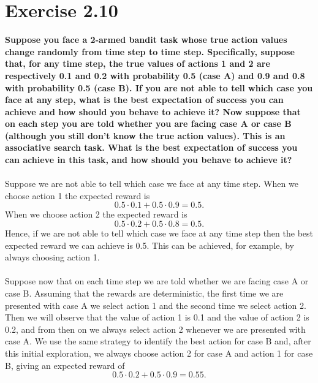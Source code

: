 \documentclass[a4paper,11pt]{article}
\numberwithin{equation}{section}
\theoremstyle{remark}
\begin{document}
\section{Exercise 2.10}

\textbf{Suppose you face a 2-armed bandit task whose true action values change randomly from time step to time step. Specifically, suppose that, for any time step, the true values of actions 1 and 2 are respectively 0.1 and 0.2 with probability 0.5 (case A) and 0.9 and 0.8 with probability 0.5 (case B). If you are not able to tell which case you face at any step, what is the best expectation of success you can achieve and how should you behave to achieve it? Now suppose that on each step you are told whether you are facing case A or case B (although you still don’t know the true action values). This is an associative search task. What is the best expectation of success you can achieve in this task, and how should you behave to achieve it?}
\\ \\
Suppose we are not able to tell which case we face at any time step. When we choose action 1 the expected reward is
\[
	0.5\cdot 0.1 + 0.5\cdot 0.9 = 0.5.
\]
When we choose action 2 the expected reward is
\[
	0.5\cdot 0.2 + 0.5\cdot 0.8 = 0.5.
\]
Hence, if we are not able to tell which case we face at any time step then the best expected reward we can achieve is 0.5. This can be achieved, for example, by always choosing action 1.
\\ \\
Suppose now that on each time step we are told whether we are facing case A or case B. Assuming that the rewards are deterministic, the first time we are presented with case A we select action 1 and the second time we select action 2. Then we will observe that the value of action 1 is 0.1 and the value of action 2 is 0.2, and from then on we always select action 2 whenever we are presented with case A. We use the same strategy to identify the best action for case B and, after this initial exploration, we always choose action 2 for case A and action 1 for case B, giving an expected reward of
\[
	0.5\cdot 0.2 + 0.5\cdot 0.9 = 0.55.
\]
\end{document}
